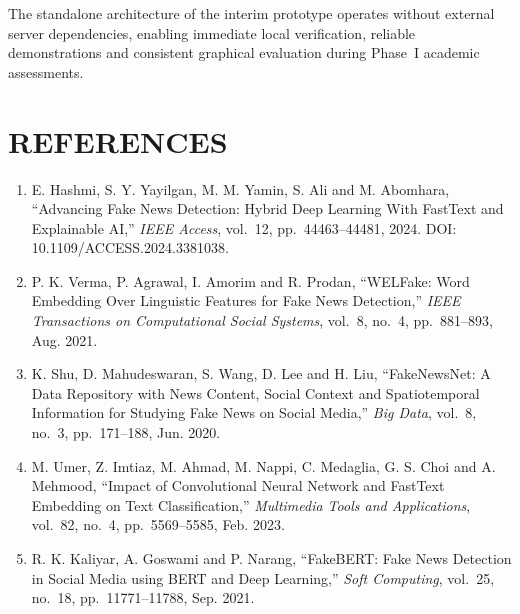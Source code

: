 \documentclass[12pt,a4paper,oneside]{report}
\begin{document}
The standalone architecture of the interim prototype operates without external server
dependencies, enabling immediate local verification, reliable demonstrations and consistent
graphical evaluation during Phase~I academic assessments.

\clearpage
\chapter*{REFERENCES}

\begin{enumerate}[label=\arabic*., leftmargin=*, itemsep=6pt]

  \item E. Hashmi, S. Y. Yayilgan, M. M. Yamin, S. Ali and M. Abomhara,
        ``Advancing Fake News Detection: Hybrid Deep Learning With FastText and
        Explainable AI,'' \textit{IEEE Access}, vol.~12, pp.~44463--44481, 2024.
        DOI: 10.1109/ACCESS.2024.3381038.

  \item P. K. Verma, P. Agrawal, I. Amorim and R. Prodan,
        ``WELFake: Word Embedding Over Linguistic Features for Fake News Detection,''
        \textit{IEEE Transactions on Computational Social Systems},
        vol.~8, no.~4, pp.~881--893, Aug. 2021.

  \item K. Shu, D. Mahudeswaran, S. Wang, D. Lee and H. Liu,
        ``FakeNewsNet: A Data Repository with News Content, Social Context and
        Spatiotemporal Information for Studying Fake News on Social Media,''
        \textit{Big Data}, vol.~8, no.~3, pp.~171--188, Jun. 2020.

  \item M. Umer, Z. Imtiaz, M. Ahmad, M. Nappi, C. Medaglia, G. S. Choi and
        A. Mehmood,
        ``Impact of Convolutional Neural Network and FastText Embedding on Text
        Classification,'' \textit{Multimedia Tools and Applications},
        vol.~82, no.~4, pp.~5569--5585, Feb. 2023.

  \item R. K. Kaliyar, A. Goswami and P. Narang,
        ``FakeBERT: Fake News Detection in Social Media using BERT and Deep
        Learning,'' \textit{Soft Computing}, vol.~25, no.~18,
        pp.~11771--11788, Sep. 2021.


\end{enumerate}
\end{document}
